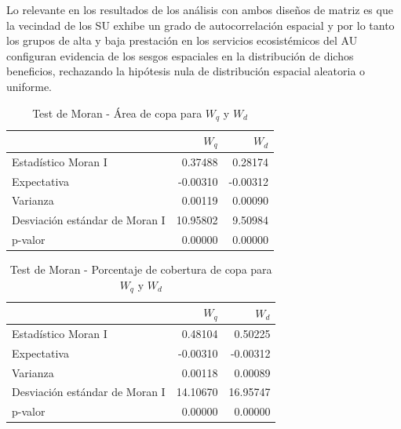 \documentclass[12pt,a4paper,openany]{book}
\theoremstyle{definition}
\theoremstyle{definition}
\theoremstyle{definition}
\theoremstyle{remark}
\begin{document}
Lo relevante en los resultados de los análisis con ambos diseños de
matriz es que la vecindad de los SU exhibe un grado de autocorrelación
espacial y por lo tanto los grupos de alta y baja prestación en los
servicios ecosistémicos del AU configuran evidencia de los sesgos
espaciales en la distribución de dichos beneficios, rechazando la
hipótesis nula de distribución espacial aleatoria o uniforme.

\begin{table}[t]

\caption{\label{tab:moran-copa-w}Test de Moran - Área de copa para $W_q$ y $W_d$}
\centering
\begin{tabular}{lrr}
\toprule
  & $W_q$ & $W_d$\\
\midrule
Estadístico Moran I & 0.37488 & 0.28174\\
Expectativa & -0.00310 & -0.00312\\
Varianza & 0.00119 & 0.00090\\
Desviación estándar de Moran I & 10.95802 & 9.50984\\
p-valor & 0.00000 & 0.00000\\
\bottomrule
\end{tabular}
\end{table}

\begin{table}[t]

\caption{\label{tab:moran-copaap-w}Test de Moran - Porcentaje de cobertura de copa para $W_q$ y $W_d$}
\centering
\begin{tabular}{lrr}
\toprule
  & $W_q$ & $W_d$\\
\midrule
Estadístico Moran I & 0.48104 & 0.50225\\
Expectativa & -0.00310 & -0.00312\\
Varianza & 0.00118 & 0.00089\\
Desviación estándar de Moran I & 14.10670 & 16.95747\\
p-valor & 0.00000 & 0.00000\\
\bottomrule
\end{tabular}
\end{table}
\end{document}
